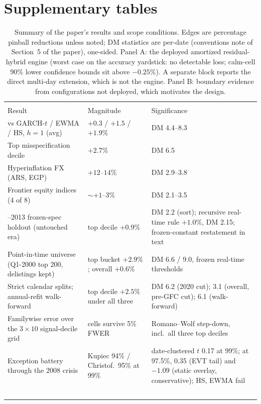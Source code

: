 \documentclass[11pt]{article}
\begin{document}
\section{Supplementary tables}
\begin{table}[htbp]
\centering\small
\begin{threeparttable}
\caption{Summary of the paper's results and scope conditions. Edges are
percentage pinball reductions unless noted; DM statistics are per-date
(conventions note of Section~5 of the paper), one-sided. Panel A: the deployed amortized
residual-hybrid engine (worst case on the accuracy yardstick: no
detectable loss; calm-cell 90\% lower confidence bounds sit above
$-0.25\%$). A separate block reports the direct multi-day
extension, which is not the engine. Panel B: boundary
evidence from configurations not deployed, which motivates the design.}
\label{tab:winloss}
\footnotesize\setlength{\tabcolsep}{3.5pt}
\begin{tabular}{>{\raggedright\arraybackslash}p{}>{\raggedright\arraybackslash}p{}>{\raggedright\arraybackslash}p{}}
\toprule
\multicolumn{3}{l}{\emph{Panel A: the engine}} \\
Result & Magnitude & Significance \\
\midrule
vs GARCH-$t$ / EWMA / HS, $h{=}1$ (avg) & $+0.3$ / $+1.5$ / $+1.9\%$ & DM 4.4--8.3 \\
Top misspecification decile & $+2.7\%$ & DM 6.5 \\
Hyperinflation FX (ARS, EGP) & $+12$--$14\%$ & DM 2.9--3.8 \\
Frontier equity indices (4 of 8) & $\sim$$+1$--$3\%$ & DM 2.1--3.5 \\
2000--2013 frozen-spec holdout (untouched era) & top decile $+0.9\%$ & DM 2.2 (sort); recursive real-time rule $+1.0\%$, DM 2.15; frozen-constant restatement in text \\
Point-in-time universe (Q1-2000 top 200, delistings kept) & top bucket $+2.9\%$; overall $+0.6\%$ & DM 6.6 / 9.0, frozen real-time thresholds \\
Strict calendar splits; annual-refit walk-forward & top decile $+2.5\%$ under all three & DM 6.2 (2020 cut); 3.1 (overall, pre-GFC cut); 6.1 (walk-forward) \\
Familywise error over the $3\times10$ signal-decile grid & 9 cells survive 5\% FWER & Romano--Wolf step-down, incl.\ all three top deciles \\
Exception battery through the 2008 crisis & Kupiec 94\% / Christof.\ 95\% at 99\% & date-clustered $t$ 0.17 at 99\%; at 97.5\%, 0.35 (EVT tail) and $-1.09$ (static overlay, conservative); HS, EWMA fail \\
$$
\end{tabular}
\end{threeparttable}
\end{table}
\end{document}
